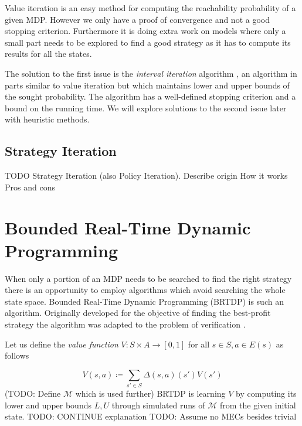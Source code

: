 Value iteration is an easy method for computing the reachability
probability of a given MDP.  However we only have a proof of convergence
and not a good stopping criterion.  Furthermore it is doing extra work
on models where only a small part needs to be explored to find a good
strategy as it has to compute its results for all the states.

The solution to the first issue is the {\em interval iteration}
algorithm \parencite{interval_iteration}, an algorithm in parts similar
to value iteration but which maintains lower and upper bounds of the
sought probability. The algorithm has a well-defined stopping criterion
and a bound on the running time.  We will explore solutions to the
second issue later with heuristic methods.


\subsection{Strategy Iteration}

TODO
Strategy Iteration (also Policy Iteration).
Describe origin
How it works
Pros and cons

\section{Bounded Real-Time Dynamic Programming}

When only a portion of an MDP needs to be searched to find the right
strategy there is an opportunity to employ algorithms which avoid
searching the whole state space. Bounded Real-Time Dynamic Programming
(BRTDP) is such an algorithm. Originally developed for
the objective of finding the best-profit strategy
\parencite{profit_brtdp} the algorithm was adapted to the problem of
verification \parencite{atva14}.

Let us define the {\em value function} $V : S \times A \to
[0,1]$ for all $s \in S, a \in E(s)$ as follows

\[
    V(s,a) \coloneqq \sum_{s' \in S} \Delta(s,a)(s')V(s')
\]
(TODO: Define $\mathcal{M}$ which is used further)
BRTDP is learning $V$ by computing its lower and upper bounds $L, U$
through simulated runs of $\mathcal{M}$ from the given initial state.
TODO: CONTINUE explanation
TODO: Assume no MECs besides trivial

